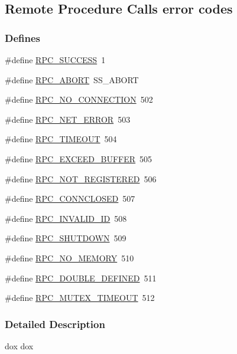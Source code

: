 \subsection{Remote Procedure Calls error codes}
\label{group__err25}
\subsubsection*{Defines}
\begin{DoxyCompactItemize}
\item 
\#define \hyperlink{group__err25_ga19b06966ce058cda8e5dca8d682b2bd3}{RPC\_\-SUCCESS}~1
\item 
\#define \hyperlink{group__err25_ga2a163d317723a6d3ac14627503f6ca7a}{RPC\_\-ABORT}~SS\_\-ABORT
\item 
\#define \hyperlink{group__err25_gad3a9f2a6b26ce5b987f6b2088fbb627c}{RPC\_\-NO\_\-CONNECTION}~502
\item 
\#define \hyperlink{group__err25_gae7db91aa77eeed4371ba30dfc122ded6}{RPC\_\-NET\_\-ERROR}~503
\item 
\#define \hyperlink{group__err25_gad29d62bce98ff8494be9337cb1a0a1f1}{RPC\_\-TIMEOUT}~504
\item 
\#define \hyperlink{group__err25_ga1a35d5e05d16d9040eaad41c4434a20a}{RPC\_\-EXCEED\_\-BUFFER}~505
\item 
\#define \hyperlink{group__err25_ga8e46f3de256d0dc247efd6386b5b5a39}{RPC\_\-NOT\_\-REGISTERED}~506
\item 
\#define \hyperlink{group__err25_ga50c5b6ef0ae99ed578f9209fdd961ac1}{RPC\_\-CONNCLOSED}~507
\item 
\#define \hyperlink{group__err25_ga3cbff68ac5b5d52f692b8e880f9ef76c}{RPC\_\-INVALID\_\-ID}~508
\item 
\#define \hyperlink{group__err25_ga0406ee07e8c5afbf8e46cb0eed698bcd}{RPC\_\-SHUTDOWN}~509
\item 
\#define \hyperlink{group__err25_ga810bf4af4a5d29b1d1d1423e8889b35f}{RPC\_\-NO\_\-MEMORY}~510
\item 
\#define \hyperlink{group__err25_ga68d214e584f6bcd6e91f25f1b9d79f54}{RPC\_\-DOUBLE\_\-DEFINED}~511
\item 
\#define \hyperlink{group__err25_gab7747c8b74d827488058ef9a0f9d3fc5}{RPC\_\-MUTEX\_\-TIMEOUT}~512
\end{DoxyCompactItemize}


\subsubsection{Detailed Description}
dox dox 

